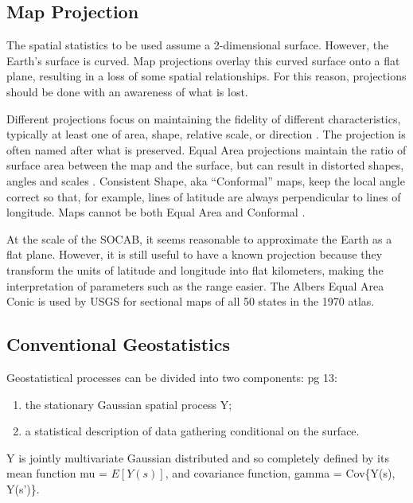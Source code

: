 \documentclass{article}
\begin{document}
\subsection{Map Projection} \label{subsec:MapProjection}
The spatial statistics to be used assume a 2-dimensional surface. However, the Earth's surface is curved.  Map projections overlay this curved surface onto a flat plane, resulting in a loss of some spatial relationships.  For this reason, projections should be done with an awareness of what is lost.  

Different projections focus on maintaining the fidelity of different characteristics, typically at least one of area, shape, relative scale, or direction \citep{USGS:MapProjections}.  The projection is often named after what is preserved.  Equal Area projections maintain the ratio of surface area between the map and the surface, but can result in distorted shapes, angles and scales \citep{USGS:MapProjections}.  Consistent Shape,  aka ``Conformal'' maps, keep the local angle correct so that, for example, lines of latitude are always perpendicular to lines of longitude.  Maps cannot be both Equal Area and Conformal  \citep{USGS:MapProjections}.

At the scale of the \ac{SOCAB}, it seems reasonable to approximate the Earth as a flat plane.  However, it is still useful to have a known projection because they transform the units of latitude and longitude into flat kilometers, making the interpretation of parameters such as the range easier.  The Albers Equal Area Conic is used by \ac{USGS} for sectional maps of all 50 states in the 1970 atlas.







\subsection{Conventional Geostatistics}
\label{subsec:convgeostats}

Geostatistical processes can be divided into two components: 
\citep{diggle:07} pg 13: 
\begin{enumerate}
    \item the stationary Gaussian spatial process \gls{Y};
    \item a statistical description of data gathering conditional on the surface.
\end{enumerate}

\gls{Y} is jointly multivariate Gaussian distributed and so completely defined by its mean function \gls{mu} = $E[Y(s)]$, and covariance function, \gls{gamma} = 
Cov\{Y(s), Y(s')\}.
\end{document}
